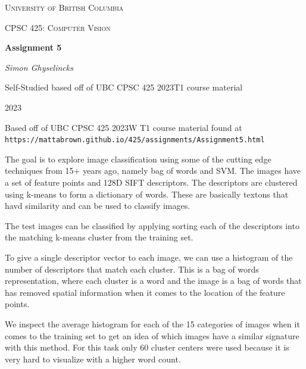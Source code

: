 \documentclass[12pt]{article}
\begin{document}
\begin{titlepage}
  \centering
  
  {\scshape\LARGE University of British Columbia \par}
  \vspace{1cm}
  {\scshape\Large CPSC 425: Computer Vision\par}
  \vspace{1.5cm}
  {\huge\bfseries Assignment 5\par}
  \vspace{2cm}
  {\Large\itshape Simon Ghyselincks\par}
  \vfill
  Self-Studied based off of UBC CPSC 425 2023T1 course material\par

  \vfill

  {\large 2023\par}
\end{titlepage}


Based off of UBC CPSC 425 2023W T1 course material found at \texttt{https://mattabrown.github.io/425/assignments/Assignment5.html}

The goal is to explore image classification using some of the cutting edge techniques from 15+ years ago, namely bag of words and SVM. The images have a set of feature points and 128D SIFT descriptors. The descriptors are clustered using k-means to form a dictionary of words. These are basically textons that havd similarity and can be used to classify images. 

The test images can be classified by applying sorting each of the descriptors into the matching k-means cluster from the training set. 

To give a single descriptor vector to each image, we can use a histogram of the number of descriptors that match each cluster. This is a bag of words representation, where each cluster is a word and the image is a bag of words that has removed spatial information when it comes to the location of the feature points.

We inspect the average histogram for each of the 15 categories of images when it comes to the training set to get an idea of which images have a similar signature with this method. For this task only 60 cluster centers were used because it is very hard to visualize with a higher word count.
\end{document}
